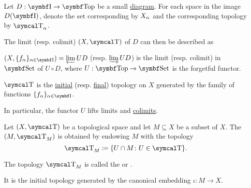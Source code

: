 \begin{proposition}\label{thm:initial_final_topology_limit}\cite{nLab:top}
  Let \( D: \Bold I \to \Cat{Top} \) be a small \hyperref[def:categorical_diagram]{diagram}. For each space in the image \( D(\Bold I) \), denote the set corresponding by \( X_\alpha \) and the corresponding topology by \( \CT_\al \).

  The limit (resp. colimit) \( (X, \CT) \) of \( D \) can then be described as
  \begin{defenum}
    \item \( (X, \{ f_\al \}_{\al \in \Cat{I}}) = \varprojlim UD \) (resp. \( \varinjlim UD \)) is the limit (resp. colimit) in \( \Cat{Set} \) of \( U \circ D \), where \( U: \Bold{Top} \to \Cat{Set} \) is the forgetful functor.
    \item \( \CT \) is the \hyperref[def:initial_topology]{initial} (resp. \hyperref[def:final_topology]{final}) topology on \( X \) generated by the family of functions \( \{ f_\al \}_{\al \in \Cat{I}} \).
  \end{defenum}

  In particular, the functor \( U \) lifts limits and \hyperref[def:categorical_limit_preservation/lift]{colimits}.
\end{proposition}

\begin{definition}\label{def:topological_subspace}
  Let \( (X, \CT) \) be a topological space and let \( M \subseteq X \) be a subset of \( X \). The  \( (M, \CT_M) \) is obtained by endowing \( M \) with the topology
  \begin{equation*}
    \CT_M \coloneqq \{ U \cap M \colon U \in \CT \}.
  \end{equation*}

  The topology \( \CT_M \) is called the  or .

  It is the initial topology generated by the canonical embedding \( \iota: M \to X \).
\end{definition}

